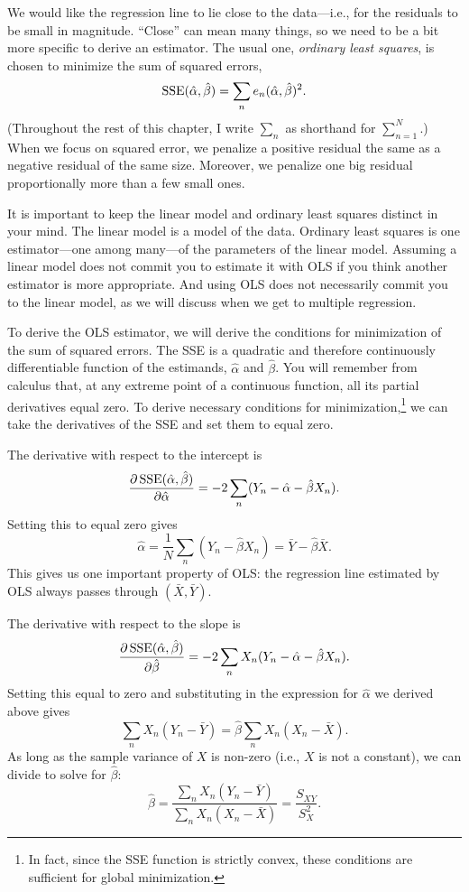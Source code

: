 \documentclass[
  12pt,
  oneside,openany]{book}
\begin{document}
We would like the regression line to lie close to the data---i.e., for the residuals to be small in magnitude. ``Close'' can mean many things, so we need to be a bit more specific to derive an estimator. The usual one, \emph{ordinary least squares}, is chosen to minimize the sum of squared errors,
\[
\mathop{\rm SSE}\nolimits(\hat{\alpha}, \hat{\beta}) = \sum_n e_n(\hat{\alpha}, \hat{\beta})^2.
\]
(Throughout the rest of this chapter, I write \(\sum_n\) as shorthand for \(\sum_{n=1}^N\).) When we focus on squared error, we penalize a positive residual the same as a negative residual of the same size. Moreover, we penalize one big residual proportionally more than a few small ones.

It is important to keep the linear model and ordinary least squares distinct in your mind. The linear model is a model of the data. Ordinary least squares is one estimator---one among many---of the parameters of the linear model. Assuming a linear model does not commit you to estimate it with OLS if you think another estimator is more appropriate. And using OLS does not necessarily commit you to the linear model, as we will discuss when we get to multiple regression.

To derive the OLS estimator, we will derive the conditions for minimization of the sum of squared errors. The SSE is a quadratic and therefore continuously differentiable function of the estimands, \(\hat{\alpha}\) and \(\hat{\beta}\). You will remember from calculus that, at any extreme point of a continuous function, all its partial derivatives equal zero. To derive necessary conditions for minimization,\footnote{In fact, since the SSE function is strictly convex, these conditions are sufficient for global minimization.} we can take the derivatives of the SSE and set them to equal zero.

The derivative with respect to the intercept is
\[
\frac{\partial{}\mathop{\rm SSE}\nolimits(\hat{\alpha}, \hat{\beta})}{\partial{}\hat{\alpha}}
= -2 \sum_n (Y_n - \hat{\alpha} - \hat{\beta} X_n).
\]
Setting this to equal zero gives
\[
\hat{\alpha}
= \frac{1}{N} \sum_n (Y_n - \hat{\beta} X_n)
= \bar{Y} - \hat{\beta} \bar{X}.
\]
This gives us one important property of OLS: the regression line estimated by OLS always passes through \((\bar{X}, \bar{Y})\).

The derivative with respect to the slope is
\[
\frac{\partial{}\mathop{\rm SSE}\nolimits(\hat{\alpha}, \hat{\beta})}{\partial{}\hat{\beta}}
= -2 \sum_n X_n (Y_n - \hat{\alpha} - \hat{\beta} X_n).
\]
Setting this equal to zero and substituting in the expression for \(\hat{\alpha}\) we derived above gives
\[
\sum_n X_n (Y_n - \bar{Y}) = \hat{\beta} \sum_n X_n (X_n - \bar{X}).
\]
As long as the sample variance of \(X\) is non-zero (i.e., \(X\) is not a constant), we can divide to solve for \(\hat{\beta}\):
\[
\hat{\beta}
= \frac{\sum_n X_n (Y_n - \bar{Y})}{\sum_n X_n (X_n - \bar{X})}
= \frac{S_{XY}}{S_X^2}.
\]
\end{document}
